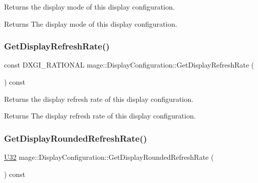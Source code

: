Returns the display mode of this display configuration.

\begin{DoxyReturn}{Returns}
The display mode of this display configuration. 
\end{DoxyReturn}
\hypertarget{structmage_1_1_display_configuration_aa92237613f8077d189f9504fec371cb8}{}\label{structmage_1_1_display_configuration_aa92237613f8077d189f9504fec371cb8} 
\subsubsection{\texorpdfstring{Get\+Display\+Refresh\+Rate()}{GetDisplayRefreshRate()}}
{\footnotesize\ttfamily const D\+X\+G\+I\+\_\+\+R\+A\+T\+I\+O\+N\+AL mage\+::\+Display\+Configuration\+::\+Get\+Display\+Refresh\+Rate (\begin{DoxyParamCaption}{ }\end{DoxyParamCaption}) const\hspace{0.3cm}{\ttfamily [noexcept]}}

Returns the display refresh rate of this display configuration.

\begin{DoxyReturn}{Returns}
The display refresh rate of this display configuration. 
\end{DoxyReturn}
\hypertarget{structmage_1_1_display_configuration_aada8415f1dbebb7f24decc2d5bf030ab}{}\label{structmage_1_1_display_configuration_aada8415f1dbebb7f24decc2d5bf030ab} 
\subsubsection{\texorpdfstring{Get\+Display\+Rounded\+Refresh\+Rate()}{GetDisplayRoundedRefreshRate()}}
{\footnotesize\ttfamily \hyperlink{namespacemage_a41c104c036fba3756a74e19f793eeaa1}{U32} mage\+::\+Display\+Configuration\+::\+Get\+Display\+Rounded\+Refresh\+Rate (\begin{DoxyParamCaption}{ }\end{DoxyParamCaption}) const\hspace{0.3cm}{\ttfamily [noexcept]}}

